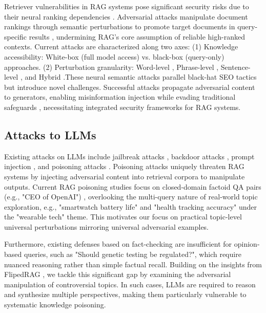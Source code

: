 Retriever vulnerabilities in RAG systems pose significant security risks due to their neural ranking dependencies \cite{goren2018ranking}. Adversarial attacks manipulate document rankings through semantic perturbations to promote target documents in query-specific results \cite{liu2022order,wu2023prada}, undermining RAG's core assumption of reliable high-ranked contexts.
Current attacks are characterized along two axes: (1) Knowledge accessibility: White-box (full model access) vs. black-box (query-only) approaches. (2) Perturbation granularity: Word-level \cite{raval2020one,liu2023black,liu2023topic,wu2023prada}, Phrase-level \cite{song2020adversarial,liu2022order,chen2025flipedragblackboxopinionmanipulation}, Sentence-level \cite{chen2023towards}, and Hybrid \cite{liu2024multi}.These neural semantic attacks parallel black-hat SEO tactics \cite{gyongyi2005web} but introduce novel challenges. Successful attacks propagate adversarial content to generators, enabling misinformation injection while evading traditional safeguards \cite{zhong2023poisoning,chen2025flipedragblackboxopinionmanipulation}, necessitating integrated security frameworks for RAG systems.

\subsection{Attacks to LLMs}

Existing attacks on LLMs include jailbreak attacks \cite{wei2024jailbroken,deng2024masterkey,li2023multi,lin2024figure}, backdoor attacks \cite{kandpal2023backdoor,lu2024test,cao2023stealthy}, prompt injection \cite{liu2023prompt,perez2022ignore,greshake2023not}, and poisoning attacks \cite{shafran2024machine,zou2024poisonedrag,cho2024typos,zhong2023poisoning,chen2025flipedragblackboxopinionmanipulation,zhang2024hijackrag}. Poisoning attacks uniquely threaten RAG systems by injecting adversarial content into retrieval corpora to manipulate outputs. Current RAG poisoning studies focus on closed-domain factoid QA pairs (e.g., "CEO of OpenAI") \cite{zou2024poisonedrag,zhong2023poisoning,cho2024typos,shafran2024machine,zhang2024hijackrag}, overlooking the multi-query nature of real-world topic exploration\cite{liu2023topic,xue2024badrag}, e.g., "smartwatch battery life" and "health tracking accuracy" under the "wearable tech" theme. This motivates our focus on practical topic-level universal perturbations mirroring universal adversarial examples.

Furthermore, existing defenses based on fact-checking are insufficient for opinion-based queries, such as "Should genetic testing be regulated?", which require nuanced reasoning rather than simple factual recall. Building on the insights from FlipedRAG \cite{chen2025flipedragblackboxopinionmanipulation}, we tackle this significant gap by examining the adversarial manipulation of controversial topics. In such cases, LLMs are required to reason and synthesize multiple perspectives, making them particularly vulnerable to systematic knowledge poisoning.
